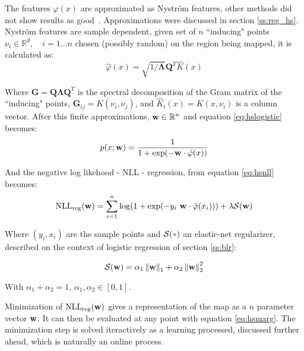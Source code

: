 The features $\varphi(x)$ are approximated as Nystr\"om features, other
methods did not show results as good~\cite{ramos2016hilbert}. Approximations
were discussed in section \ref{ss:reg_hs}. Nystr\"om features are sample
dependent, given set of $n$ ``inducing" points $\nu_i\in\mathbb{R}^d, \quad
i=1\ldots n$ chosen (possibly random) on the region being mapped, it is
calculated as:
\begin{equation}
\label{eq:nystrom}
\hat\varphi(x) = \sqrt{1/\mathbf{\Lambda}}\mathbf{Q}^T\hat K(x)
\end{equation}
 
 Where $\mathbf{G}=\mathbf{Q}\mathbf{\Lambda}\mathbf{Q}^T$ is the
 spectral decomposition of the Gram matrix of the ``inducing" points,
 $\mathbf{G}_{ij}=K(\nu_i,\nu_j)$, and ${\displaystyle\hat K}_i(x) = K(x,\nu_i)$
 is a column vector. After this finite approximations,
 $\mathrm{\mathbf{w}}\in\mathbb{R}^n$ and equation \ref{eq:hslogistic} becomes:
\begin{equation}
\label{eq:hsmarg}
p(x;\mathrm{\mathbf{w}}) = \frac{1}{1+\exp(-\mathrm{\mathbf{w}}\cdot \hat\varphi(x))}
\end{equation}
 
 And the negative log likehood - NLL - regression, from equation \ref{eq:hsnll}
 becomes:
\begin{equation}
\label{eq:finitenll}
\text{NLL}_{\text{reg}}(\mathrm{\mathbf{w}}) =  \sum_{i=1}^n \log(1+\exp(-y_i~
\mathrm{\mathbf{w}}\cdot\hat\varphi(x_i))) +\lambda\mathcal{S}(\mathrm{\mathbf{w}})
\end{equation}
 
 Where $(y_i,x_i)$ are the sample points and $\mathcal{S}(\parm)$ an
 elastic-net regularizer, described on the context of logistic regression of
 section \ref{ss:blr}:
  
\begin{equation}
\label{eq:elasticnet}
\mathcal{S}(\mathrm{\mathbf{w}})=\alpha_1\left\lVert\mathrm{\mathbf{w}}\right\rVert_1 + \alpha_2\left\lVert\mathrm{\mathbf{w}}\right\rVert_2^2
\end{equation}

With $\alpha_1+\alpha_2=1$, $\alpha_1,\alpha_2\in[0,1]$.

Minimization of $\text{NLL}_{\text{reg}}(\mathrm{\mathbf{w}})$ gives a representation of
the map as a $n$ parameter vector $\mathrm{\mathbf{w}}$. It can then be evaluated at any
point with equation \ref{eq:hsmarg}. The minimization step is solved
iteractively as a learning processed, discussed further ahead, which is naturally an online
process.
 
 

